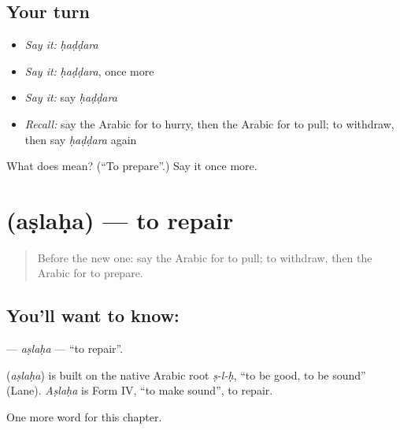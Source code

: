 \subsection*{Your turn}
\begin{itemize}
\raggedright
  \item \emph{Say it:} \emph{ḥaḍḍara}
  \item \emph{Say it:} \emph{ḥaḍḍara}, once more
  \item \emph{Say it:} say \emph{ḥaḍḍara}
  \item \emph{Recall:} say the Arabic for to hurry, then the Arabic for to pull; to withdraw, then say \emph{ḥaḍḍara} again
\end{itemize}

\begin{tcolorbox}[breakable,colback=teal!4,colframe=teal!35!black,title={Before you move on}]
What does  mean? (\textquotedblleft{}To prepare\textquotedblright{}.) Say it once more.
\end{tcolorbox}
\section[\texorpdfstring{\ar{أصلح} (aṣlaḥa)}{أصلح (aṣlaḥa)}]{ (aṣlaḥa) — to repair}

\label{lesson:AR-C225-aslaha}



\begin{quote}
Before the new one: say the Arabic for to pull; to withdraw, then the Arabic for to prepare.
\end{quote}

\subsection*{You'll want to know: }
\textbf{} — \emph{aṣlaḥa} — \textquotedblleft{}to repair\textquotedblright{}.

\begin{cousinweb}
\textbf{} (\emph{aṣlaḥa}) is built on the native Arabic root \emph{ṣ-l-ḥ}, \textquotedblleft{}to be good, to be sound\textquotedblright{} (Lane). \emph{Aṣlaḥa} is Form IV, \textquotedblleft{}to make sound\textquotedblright{}, to repair.
\end{cousinweb}

\begin{grammarlens}[title={What you've built}]
One more word for this chapter.
\end{grammarlens}

